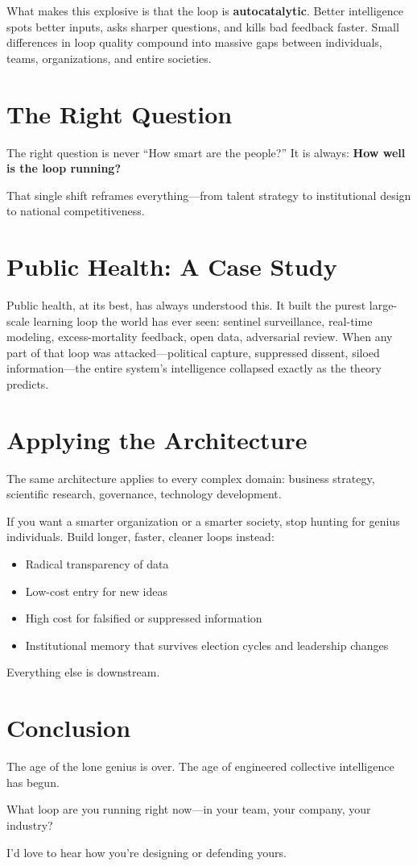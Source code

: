 \documentclass{article}
\begin{document}
What makes this explosive is that the loop is \textbf{autocatalytic}. Better intelligence spots better inputs, asks sharper questions, and kills bad feedback faster. Small differences in loop quality compound into massive gaps between individuals, teams, organizations, and entire societies.

\section*{The Right Question}

The right question is never ``How smart are the people?'' It is always: \textbf{How well is the loop running?}

That single shift reframes everything—from talent strategy to institutional design to national competitiveness.

\section*{Public Health: A Case Study}

Public health, at its best, has always understood this. It built the purest large-scale learning loop the world has ever seen: sentinel surveillance, real-time modeling, excess-mortality feedback, open data, adversarial review. When any part of that loop was attacked—political capture, suppressed dissent, siloed information—the entire system’s intelligence collapsed exactly as the theory predicts.

\section*{Applying the Architecture}

The same architecture applies to every complex domain: business strategy, scientific research, governance, technology development.

If you want a smarter organization or a smarter society, stop hunting for genius individuals. Build longer, faster, cleaner loops instead:

\begin{itemize}
    \item Radical transparency of data
    \item Low-cost entry for new ideas
    \item High cost for falsified or suppressed information
    \item Institutional memory that survives election cycles and leadership changes
\end{itemize}

Everything else is downstream.

\section*{Conclusion}

The age of the lone genius is over. The age of engineered collective intelligence has begun.

What loop are you running right now—in your team, your company, your industry?

I’d love to hear how you’re designing or defending yours.
\end{document}
